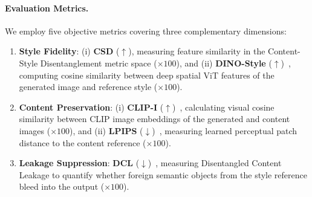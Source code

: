 \paragraph{Evaluation Metrics.}
We employ five objective metrics covering three complementary dimensions:
\begin{enumerate}
    \item \textbf{Style Fidelity}: (i) \textbf{CSD} ($\uparrow$), measuring feature similarity in the Content-Style Disentanglement metric space ($\times 100$), and (ii) \textbf{DINO-Style} ($\uparrow$)~\cite{dino}, computing cosine similarity between deep spatial ViT features of the generated image and reference style ($\times 100$).
    \item \textbf{Content Preservation}: (i) \textbf{CLIP-I} ($\uparrow$)~\cite{clip}, calculating visual cosine similarity between CLIP image embeddings of the generated and content images ($\times 100$), and (ii) \textbf{LPIPS} ($\downarrow$)~\cite{lpips}, measuring learned perceptual patch distance to the content reference ($\times 100$).
    \item \textbf{Leakage Suppression}: \textbf{DCL} ($\downarrow$)~\cite{rout2025rbmodulation}, measuring Disentangled Content Leakage to quantify whether foreign semantic objects from the style reference bleed into the output ($\times 100$).
\end{enumerate}
